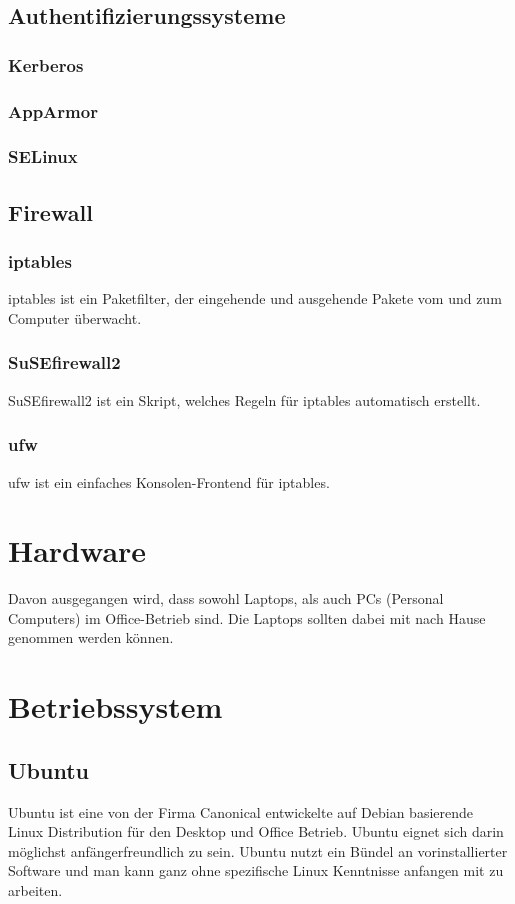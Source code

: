 \documentclass[fontsize=12pt]{scrreprt}
\begin{document}
	\subsection{Authentifizierungssysteme}
	\subsubsection{Kerberos}
	\subsubsection{AppArmor}
	\subsubsection{SELinux}
	\subsection{Firewall}
	\subsubsection{iptables}
	iptables ist ein Paketfilter, der eingehende und ausgehende Pakete vom und zum Computer überwacht.
	\subsubsection{SuSEfirewall2}
	SuSEfirewall2 ist ein Skript, welches Regeln für iptables automatisch erstellt.
	\subsubsection{ufw}
	ufw ist ein einfaches Konsolen-Frontend für iptables.
	\section{Hardware}
	Davon ausgegangen wird, dass sowohl Laptops, als auch PCs (Personal Computers) im Office-Betrieb sind. Die Laptops sollten dabei mit nach Hause genommen werden können.
	\section{Betriebssystem}
	\subsection{Ubuntu}
	Ubuntu ist eine von der Firma Canonical entwickelte auf Debian basierende Linux Distribution für den Desktop und Office Betrieb. Ubuntu eignet sich darin möglichst anfängerfreundlich zu sein. Ubuntu nutzt ein Bündel an vorinstallierter Software und man kann ganz ohne spezifische Linux Kenntnisse anfangen mit zu arbeiten.
\end{document}
